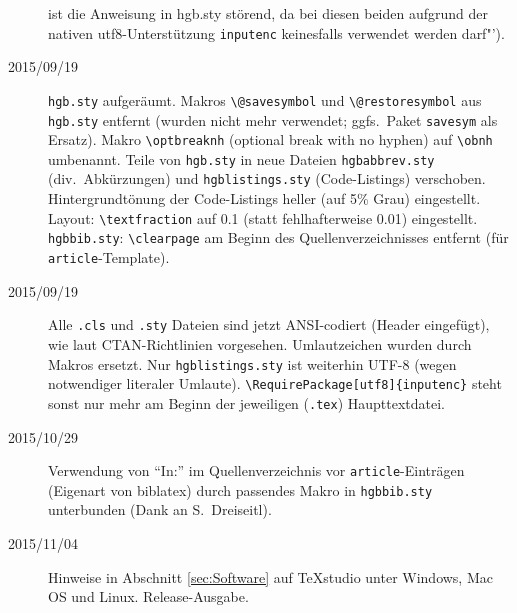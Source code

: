 \begin{sloppypar}
\begin{description}
ist die Anweisung in hgb.sty störend, da bei diesen beiden aufgrund der nativen utf8-Unterstützung 
\texttt{inputenc} keinesfalls verwendet werden darf"').
\item[2015/09/19]
\texttt{hgb.sty} aufgeräumt.
Makros \verb!\@savesymbol! und \verb!\@restoresymbol! aus \texttt{hgb.sty} entfernt
(wurden nicht mehr verwendet; ggfs.\ Paket \texttt{savesym} als Ersatz).
Makro \verb!\optbreaknh! (optional break with no hyphen) auf \verb!\obnh! umbenannt.
Teile von \texttt{hgb.sty} in neue Dateien \texttt{hgbabbrev.sty} (div.\ Abkürzungen)
und \texttt{hgblistings.sty} (Code-Listings) verschoben.
Hintergrundtönung der Code-Listings heller (auf 5\% Grau) eingestellt.
Layout: \verb!\textfraction! auf 0.1 (statt fehlhafterweise 0.01) eingestellt.
\texttt{hgbbib.sty}: \verb!\clearpage! am Beginn des Quellenverzeichnisses entfernt
(für \texttt{article}-Template).
\item[2015/09/19]
Alle \texttt{.cls} und \texttt{.sty} Dateien sind jetzt ANSI-codiert (Header eingefügt), wie
laut CTAN-Richtlinien vorgesehen. Umlautzeichen wurden durch Makros ersetzt.
Nur \texttt{hgblistings.sty} ist weiterhin UTF-8 (wegen notwendiger literaler Umlaute).
\verb!\RequirePackage[utf8]{inputenc}! steht sonst nur mehr am Beginn
der jeweiligen (\texttt{.tex}) Haupttextdatei.
\item[2015/10/29]
Verwendung von "`In:"' im Quellenverzeichnis vor \texttt{article}-Einträgen
(Eigenart von biblatex) durch passendes Makro in \texttt{hgbbib.sty} unterbunden 
(Dank an S.\ Dreiseitl).
\item[2015/11/04]
Hinweise in Abschnitt \ref{sec:Software} auf TeXstudio unter Windows, Mac OS und Linux.
Release-Ausgabe.
\end{description}

\end{sloppypar}









